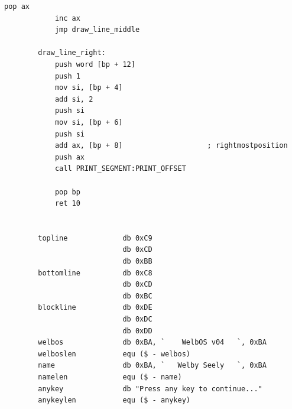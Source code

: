 \documentclass{article}
\begin{document}
\begin{lstlisting}[caption={loaderV05.asm listing}, captionpos=t]
            pop ax
            inc ax
            jmp draw_line_middle

        draw_line_right:
            push word [bp + 12]
            push 1
            mov si, [bp + 4]
            add si, 2
            push si
            mov si, [bp + 6]
            push si
            add ax, [bp + 8]                    ; rightmostposition
            push ax
            call PRINT_SEGMENT:PRINT_OFFSET

            pop bp
            ret 10


        topline             db 0xC9
                            db 0xCD
                            db 0xBB
        bottomline          db 0xC8
                            db 0xCD
                            db 0xBC
        blockline           db 0xDE
                            db 0xDC
                            db 0xDD
        welbos              db 0xBA, `    WelbOS v04   `, 0xBA
        welboslen           equ ($ - welbos)
        name                db 0xBA, `   Welby Seely   `, 0xBA
        namelen             equ ($ - name)
        anykey              db "Press any key to continue..."
        anykeylen           equ ($ - anykey)
    \end{lstlisting}
\end{document}
